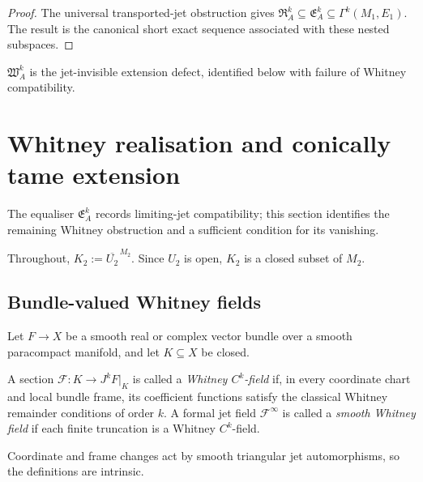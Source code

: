\documentclass[11pt]{article}
\theoremstyle{plain}
\theoremstyle{definition}
\begin{document}
\begin{proof}
The universal transported-jet obstruction gives
\(\mathfrak R_A^k \subseteq \mathfrak E_A^k \subseteq \Gamma^k(M_1,E_1)\).
The result is the canonical short exact sequence associated with these
nested subspaces.
\end{proof}

\(\mathfrak W_A^k\) is the jet-invisible extension defect, identified below with failure of Whitney compatibility.
\section{Whitney realisation and conically tame extension}
\label{sec:whitney-realisation}

The equaliser \(\mathfrak E_A^k\) records limiting-jet compatibility; this section identifies the remaining Whitney obstruction and a sufficient condition for its vanishing.

Throughout,
\(K_2 := \overline{U_2}^{\,M_2}\).
Since \(U_2\) is open, \(K_2\) is a closed subset of \(M_2\).

\subsection{Bundle-valued Whitney fields}
\label{subsec:bundle-valued-whitney}

Let \(F\longrightarrow X\) be a smooth real or complex vector bundle over a smooth paracompact
manifold, and let \(K\subseteq X\) be closed.

A section \(\mathcal F:K\longrightarrow J^k F|_K\) is called a \emph{Whitney \(C^k\)-field} if, in every coordinate chart
and local bundle frame, its coefficient functions satisfy the
classical Whitney remainder conditions of order \(k\). A formal jet
field \(\mathcal F^\infty\) is called a \emph{smooth Whitney field} if each finite truncation is a
Whitney \(C^k\)-field.

Coordinate and frame changes act by smooth triangular jet automorphisms, so the definitions are intrinsic.
\end{document}

